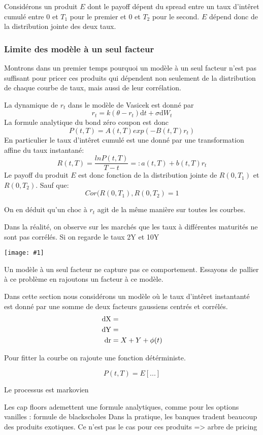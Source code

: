 \documentclass[paper=a4, fontsize=11pt]{scrartcl}
\numberwithin{equation}{section}		%
\numberwithin{figure}{section}			%
\numberwithin{table}{section}				%
\theoremstyle{definition}
\newcommand{\IMG}[3]{
  \begin{center}
    \texttt{[image: \#1]}%
    \end{center}
}
\begin{document}
Considérons un produit $E$ dont le payoff  dépent  du spread entre un taux d'intêret cumulé entre $0$ et $T_1$ pour le premier et $0$ et $T_2$ pour le second. $E$ dépend donc de la distribution jointe des deux taux.

\subsubsection*{Limite des modèle à un seul facteur}
Montrons dans un premier temps pourquoi un modèle à un seul facteur n'est pas suffisant pour pricer ces produits qui dépendent non seulement de la distribution de chaque courbe de taux, mais aussi de leur corrélation. 

La dynamique de $r_t$ dans le modèle de Vasicek est donné par
$$r_t = k(\theta - r_t)  \mathrm{d}t  + \sigma \mathrm{d}W_t$$
La formule analytique du bond zéro coupon est donc
$$P(t, T) = A(t, T) exp(-B(t, T) r_t)$$
En particulier le taux d'intêret cumulé est une donné par une transformation affine du taux instantané:
$$R(t, T) = \frac{ln P(t, T)}{T-t} =: a(t, T) + b(t, T) r_t$$
Le payoff du produit $E$ est donc fonction de la distribution jointe de $R(0, T_1)$ et $R(0, T_2)$. Sauf que:
$$Cor(R(0, T_1), R(0, T_2) = 1$$

On en déduit qu'un choc à $r_t$ agit de la même manière sur toutes les courbes.

Dans la réalité, on observe sur les marchés que les taux à différentes maturités ne sont pas corrélés. Si on regarde le taux 2Y et 10Y

\IMG{img/libor.png}{Libor}{1}

Un modèle à un seul facteur ne capture pas ce comportement. Essayons de pallier à ce problème en rajoutons un facteur à ce modèle.

Dans cette section nous considérons un modèle où le taux d'intêret instantanté est donné par une somme de deux facteurs gaussiens centrés et corrélés. 
\begin{align*}
  \rm{d}X &= \\
  \rm{d}Y &= \\
  \rm{d} r &= X + Y + \phi(t)
\end{align*}

Pour fitter la courbe on rajoute une fonction détérministe.


$$P(t, T) = E[...]$$

Le processus est markovien

Les cap floors ademettent une formule analytiques, comme pour les options vanilles : formule de blackscholes
Dans la pratique, les banques tradent beaucoup des produits exotiques. Ce n'est pas le cas pour ces produits => arbre de pricing
\end{document}
